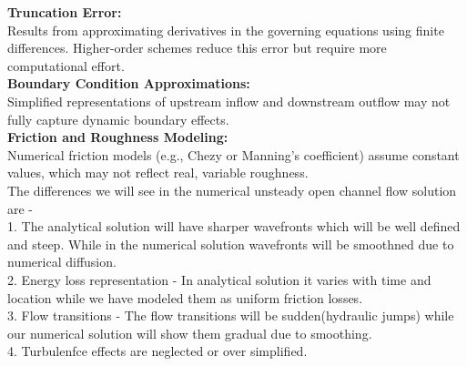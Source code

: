 \documentclass{article}
\begin{document}
\noindent
\textbf{Truncation Error:}\\
Results from approximating derivatives in the governing equations using finite differences.
Higher-order schemes reduce this error but require more computational effort.\\

\noindent
\textbf{Boundary Condition Approximations:}\\
Simplified representations of upstream inflow and downstream outflow may not fully capture dynamic boundary effects.\\

\noindent
\textbf{Friction and Roughness Modeling:}\\
Numerical friction models (e.g., Chezy or Manning's coefficient) assume constant values, which may not reflect real, variable roughness.\\

\noindent
The differences we will see in the numerical unsteady open channel flow solution are - \\

1. The analytical solution will have sharper wavefronts which will be well defined and steep. While in the numerical solution wavefronts
will be smoothned due to numerical diffusion.\\

2. Energy loss representation - In analytical solution it varies with time and location while we have modeled them as uniform friction losses.\\

3. Flow transitions - The flow transitions will be sudden(hydraulic jumps) while our numerical solution will show them gradual due to smoothing.\\

4. Turbulenfce effects are neglected or over simplified.
\end{document}
